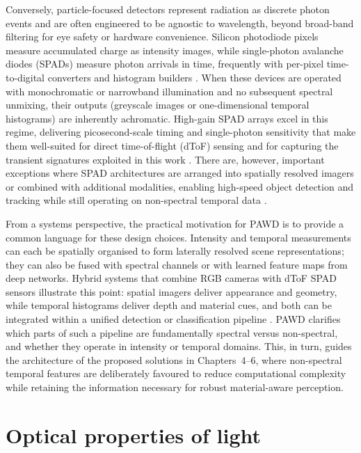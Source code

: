 \documentclass[12pt,a4paper,oneside]{report}
\let\oldsection\section
\renewcommand{\section}{\clearpage\oldsection}
\begin{document}
Conversely, particle-focused detectors represent radiation as discrete photon events and are often engineered to be agnostic to wavelength, beyond broad-band filtering for eye safety or hardware convenience. Silicon photodiode pixels measure accumulated charge as intensity images, while single-photon avalanche diodes (SPADs) measure photon arrivals in time, frequently with per-pixel time-to-digital converters and histogram builders \cite{piron2020,bass2010}. When these devices are operated with monochromatic or narrowband illumination and no subsequent spectral unmixing, their outputs (greyscale images or one-dimensional temporal histograms) are inherently achromatic. High-gain SPAD arrays excel in this regime, delivering picosecond-scale timing and single-photon sensitivity that make them well-suited for direct time-of-flight (dToF) sensing and for capturing the transient signatures exploited in this work \cite{alabbas2018}. There are, however, important exceptions where SPAD architectures are arranged into spatially resolved imagers or combined with additional modalities, enabling high-speed object detection and tracking while still operating on non-spectral temporal data \cite{moramartin2021,lyons2019}.

From a systems perspective, the practical motivation for PAWD is to provide a common language for these design choices. Intensity and temporal measurements can each be spatially organised to form laterally resolved scene representations; they can also be fused with spectral channels or with learned feature maps from deep networks. Hybrid systems that combine RGB cameras with dToF SPAD sensors illustrate this point: spatial imagers deliver appearance and geometry, while temporal histograms deliver depth and material cues, and both can be integrated within a unified detection or classification pipeline \cite{su2016,becker2023,yang2023}. PAWD clarifies which parts of such a pipeline are fundamentally spectral versus non-spectral, and whether they operate in intensity or temporal domains. This, in turn, guides the architecture of the proposed solutions in Chapters~4--6, where non-spectral temporal features are deliberately favoured to reduce computational complexity while retaining the information necessary for robust material-aware perception.

\section{Optical properties of light}
\label{sec:optical_properties_of_light}
\end{document}
